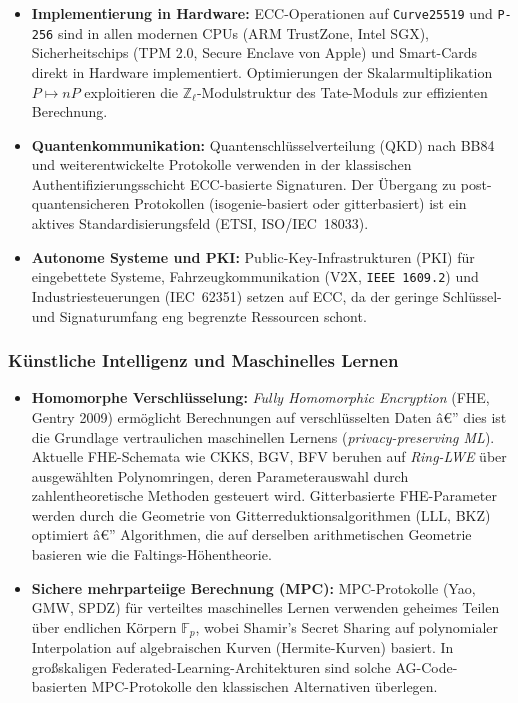 ﻿\documentclass[12pt,a4paper]{article}
\theoremstyle{plain}
\theoremstyle{definition}
\theoremstyle{remark}
\newcommand{\Z}{\mathbb{Z}}
\newcommand{\F}{\mathbb{F}}
\begin{document}
\begin{itemize}[leftmargin=2em,itemsep=4pt]
  \item \textbf{Implementierung in Hardware:}
    ECC-Operationen auf \texttt{Curve25519} und \texttt{P-256} sind in
    allen modernen CPUs (ARM TrustZone, Intel SGX), Sicherheitschips
    (TPM 2.0, Secure Enclave von Apple) und Smart-Cards direkt in Hardware implementiert.
    Optimierungen der Skalarmultiplikation $P \mapsto nP$ exploitieren die
    $\Z_\ell$-Modulstruktur des Tate-Moduls zur effizienten Berechnung.

  \item \textbf{Quantenkommunikation:}
    Quantenschlüsselverteilung (QKD) nach BB84 und weiterentwickelte Protokolle
    verwenden in der klassischen Authentifizierungsschicht ECC-basierte Signaturen.
    Der Übergang zu post-quantensicheren Protokollen (isogenie-basiert oder
    gitterbasiert) ist ein aktives Standardisierungsfeld (ETSI, ISO/IEC~18033).

  \item \textbf{Autonome Systeme und PKI:}
    Public-Key-Infrastrukturen (PKI) für eingebettete Systeme, Fahrzeugkommunikation
    (V2X, \texttt{IEEE~1609.2}) und Industriesteuerungen (IEC~62351)
    setzen auf ECC, da der geringe Schlüssel- und Signaturumfang
    eng begrenzte Ressourcen schont.
\end{itemize}

\subsubsection{Künstliche Intelligenz und Maschinelles Lernen}

\begin{itemize}[leftmargin=2em,itemsep=4pt]
  \item \textbf{Homomorphe Verschlüsselung:}
    \emph{Fully Homomorphic Encryption} (FHE, Gentry 2009) ermöglicht Berechnungen
    auf verschlüsselten Daten â€” dies ist die Grundlage vertraulichen maschinellen
    Lernens (\emph{privacy-preserving ML}).
    Aktuelle FHE-Schemata wie CKKS, BGV, BFV beruhen auf
    \emph{Ring-LWE} über ausgewählten Polynomringen, deren Parameterauswahl
    durch zahlentheoretische Methoden gesteuert wird.
    Gitterbasierte FHE-Parameter werden durch die Geometrie von
    Gitterreduktionsalgorithmen (LLL, BKZ) optimiert â€” Algorithmen,
    die auf derselben arithmetischen Geometrie basieren wie die
    Faltings-Höhentheorie.

  \item \textbf{Sichere mehrparteiige Berechnung (MPC):}
    MPC-Protokolle (Yao, GMW, SPDZ) für verteiltes maschinelles Lernen
    verwenden geheimes Teilen über endlichen Körpern $\F_p$,
    wobei Shamir's Secret Sharing auf polynomialer Interpolation auf
    algebraischen Kurven (Hermite-Kurven) basiert.
    In großskaligen Federated-Learning-Architekturen sind solche AG-Code-basierten
    MPC-Protokolle den klassischen Alternativen überlegen.
\end{itemize}
\end{document}
